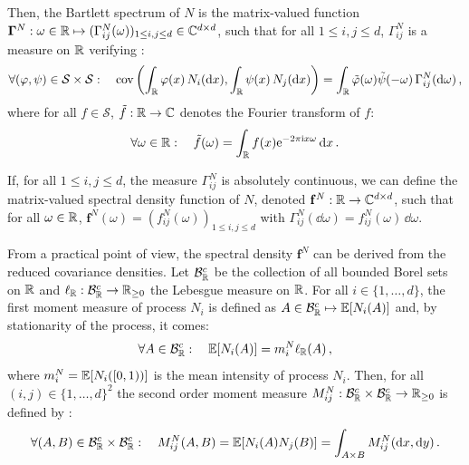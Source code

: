         Then, the Bartlett spectrum of $N$ is the
        matrix-valued function $\mathbf{\Gamma}^N : \omega \in {\mathbb R} \mapsto (\Gamma_{ij}^N(\omega))_{1 \le i, j \le d} \in \mathbb C^{d \times d}$, such that for all $1 \le i,j \le d$, $\Gamma_{ij}^N$ is a measure on ${\mathbb R}$ verifying \parencite[Equation 8.4.13]{DaleyV1}:
        \[
          \forall (\varphi, \psi) \in \mathcal S \times \mathcal S:
          \quad
          \operatorname{cov} \left(
            \int_{{\mathbb R}}{\varphi(x) \, N_i(\mathrm{d}x)} , \int_{{\mathbb R}}{\psi(x) \, N_j(\mathrm{d}x)}
          \right)
          = \int_{{\mathbb R}}{ \tilde{\varphi} (\omega) \tilde{\psi}(-\omega) \, \Gamma_{ij}^N (\mathrm{d}\omega)}\,,
        \]        
        where for all $f \in \mathcal S$, $\tilde f : {\mathbb R} \to \mathbb C$ denotes the Fourier transform of $f$:
        \[
          \forall \omega \in {\mathbb R}: \quad
          \tilde f(\omega) = \int_{{\mathbb R}}{ f(x) \mathrm{e}^{-2\pi \mathrm{i} x \omega} \, {\mathrm{d}} x} \,.
        \]
        
        If, for all $1 \le i, j \le d$, the measure $\Gamma_{ij}^N$ is absolutely continuous,
        we can define the matrix-valued spectral density function of $N$, denoted $\mathbf f^N : {\mathbb R} \to \mathbb C^{d \times d}$,
        such that for all $\omega \in {\mathbb R}$, $\mathbf f^N(\omega) = (f^N_{ij}(\omega))_{1 \le i, j \le d}$
        with \(\Gamma_{ij}^N(\dd \omega) = f_{ij}^N(\omega) \, \dd \omega\).
      	
      	From a practical point of view, the spectral density $\mathbf f^N$ can be derived from the reduced covariance densities. 
        Let $\mathcal{B}_{{\mathbb R}}^c$ be the collection of all bounded Borel sets on \({\mathbb R}\) and $\ell_{{\mathbb R}} : \mathcal B_{{\mathbb R}}^c \to {\mathbb R}_{\ge0}$ the Lebesgue measure on \({\mathbb R}\).
        For all $i \in \{1, \dots, d\}$, the first moment measure of process $N_i$ is defined as $A \in \mathcal B_{\mathbb R}^c \mapsto {\mathbb E}[N_i(A)]$ and, by stationarity of the process,
        it comes:
        \[\forall A\in\mathcal{B}_{{\mathbb R}}^c: \quad {\mathbb E}[N_i(A)] = m_i^N \ell_{{\mathbb R}}(A)\,,\]
        where $m_i^N = {\mathbb E}[N_i([0, 1))]$ is the mean intensity of process $N_i$.
        Then, for all \((i, j) \in \{1, \dots, d\}^2\) the second order moment measure $M_{ij}^N : \mathcal B_{\mathbb R}^c \times \mathcal B_{\mathbb R}^c \to {\mathbb R}_{\ge0}$ is defined by \parencite[Section~5.4]{DaleyV1}:
        \[
          \forall (A, B) \in \mathcal{B}_{{\mathbb R}}^c \times \mathcal{B}_{{\mathbb R}}^c: \quad
    	    M_{ij}^N(A, B) = {\mathbb E}[N_i(A)N_j(B)] = \int_{A\times B}{M_{ij}^N({\mathrm{d}} x, {\mathrm{d}} y)} \,. 
        \]
        
